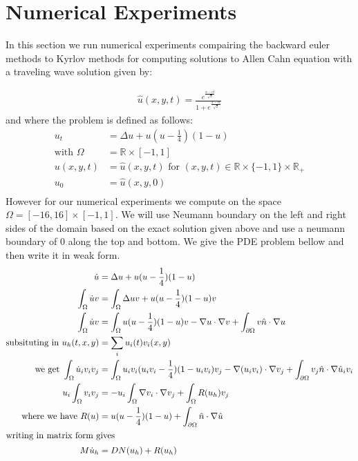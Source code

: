 \section{Numerical Experiments}

In this section we run numerical experiments compairing the backward euler methods to Kyrlov methods for computing solutions to Allen Cahn equation with a traveling wave solution\cite{YukitakaFukao2004} given by:

\begin{align}
    \hat u(x,y,t)=\frac{e^{\frac{x-ct}{\sqrt2}}}{1+e^{\frac{x-ct}{\sqrt2}}} \label{TravelingWaveSol}
\end{align}
and where the problem is defined as follows:
\begin{align*}
    u_t&=\Delta u+u(u-\frac14)(1-u)\\
    \text{with } \Omega &= \mathbb{R}\times[-1,1]\\
    u(x,y,t) &= \hat u(x,y,t) \text{ for $(x,y,t) \in \mathbb{R}\times\{-1,1\}\times\mathbb{R}_+$}\\
    u_0 &= \hat u(x,y,0)\\
\end{align*}
However for our numerical experiments we compute on the space $\Omega=[-16,16]\times[-1,1]$.
We will use Neumann boundary on the left and right sides of the domain based on the exact solution given above and use a neumann boundary of $0$ along the top and bottom.
We give the PDE problem bellow and then write it in weak form.
\begin{align*}
    \dot u&=\Delta u+u(u-\frac14)(1-u)\\
    \int_{\Omega} \dot u v &=\int_{\Omega} \Delta uv+u(u-\frac14)(1-u)v\\
    \int_{\Omega} \dot u v &=\int_{\Omega} u(u-\frac14)(1-u)v - \nabla u \cdot \nabla v + \int_{\partial\Omega}  v\hat n \cdot \nabla u\\
    \text{subsituting in } u_h(t,x,y) &= \sum_i u_i(t) v_i(x,y)\\
    \text{we get } \int_{\Omega} \dot u_i v_i v_j &=\int_{\Omega} u_iv_i(u_iv_i-\frac14)(1-u_iv_i)v_j - \nabla (u_iv_i) \cdot \nabla v_j + \int_{\partial\Omega}  v_j\hat n \cdot \nabla \hat u_iv_i\\
    u_i\int_{\Omega}v_iv_j &= -u_i\int_{\Omega}\nabla v_i \cdot \nabla v_j + \int_{\Omega}R(u_h)v_j\\
    \text{where we have } R(u)&=u(u-\frac14)(1-u) + \int_{\partial\Omega}  \hat n \cdot \nabla \hat  u\\
    \intertext{writing in matrix form gives}
    M\dot u_h &= DN(u_h) + R(u_h)\\
\end{align*}

